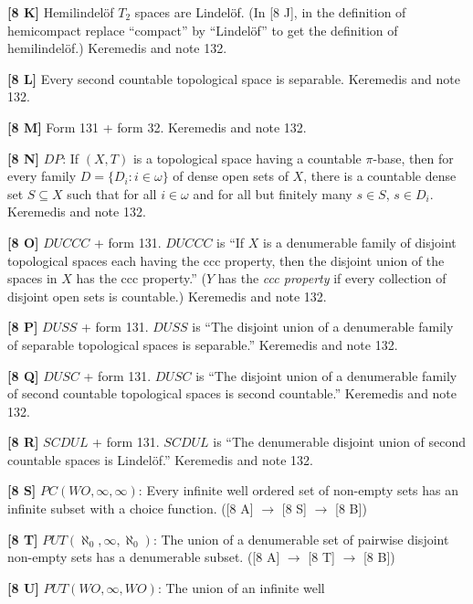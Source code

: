 \smallskip
\item{}{\bf [8 K]} Hemilindel\"of $T_2$ spaces are Lindel\"of.
(In [8 J], in the definition of hemicompact replace ``compact''
by ``Lindel\"of'' to get the definition of hemilindel\"of.)
\ac{Keremedis} \cite{1998b} and note 132.
\smallskip
\item{}{\bf [8 L]} Every second countable topological space is separable.
\ac{Keremedis} \cite{1998b} and note 132.
\smallskip
\item{}{\bf [8 M]} Form 131 + form 32. \ac{Keremedis} \cite{1998b} and note
132.
\smallskip
\item{}{\bf [8 N]} $DP$: If $(X,T)$ is a topological space having a
countable $\pi$-base, then for every family $D=\{D_i: i\in\omega\}$ of
dense open sets of $X$, there is a countable dense set $S\subseteq X$ such
that for all $i\in\omega$ and for all but finitely many $s\in S$,
$s\in D_i$.  \ac{Keremedis} \cite{1998b} and note 132.
\smallskip
\item{}{\bf [8 O]}  $DUCCC$ + form 131.
$DUCCC$ is ``If $X$ is a denumerable family of disjoint topological
spaces each having the ccc property, then the disjoint union of the
spaces in $X$ has the ccc property.'' ($Y$ has the {\it ccc property} if
every collection of disjoint open sets is countable.)
\ac{Keremedis} \cite{1998b} and note 132.
\smallskip
\item{}{\bf [8 P]} $DUSS$ + form 131.
$DUSS$ is ``The disjoint union of a denumerable family of separable
topological spaces is separable.'' \ac{Keremedis} \cite{1998b} and note
132.
\smallskip
\item{}{\bf [8 Q]} $DUSC$ + form 131.
$DUSC$ is ``The disjoint union of a denumerable family of second
countable topological spaces is second countable.'' \ac{Keremedis}
\cite{1998b} and note 132.
\smallskip
\item{}{\bf [8 R]} $SCDUL$ + form 131.
$SCDUL$ is ``The denumerable disjoint union of second countable
spaces is Lindel\"of.'' \ac{Keremedis} \cite{1998b} and note 132.
\smallskip
\item{}{\bf [8 S]} $PC(WO,\infty,\infty)$: Every infinite well ordered
set of non-empty sets has an infinite subset with a choice function.
([8 A] $\to$ [8 S] $\to$ [8 B])
\smallskip
\item{}{\bf [8 T]} $PUT(\aleph_0,\infty,\aleph_0)$: The union of a
denumerable set of pairwise disjoint non-empty sets has a denumerable
subset. ([8 A] $\to$ [8 T] $\to$ [8 B])
\smallskip
\item{}{\bf [8 U]} $PUT(WO,\infty,WO)$: The union of an infinite well
